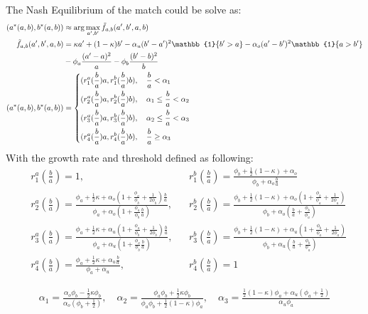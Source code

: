\documentclass{article}
\newcommand{\1}{\mathbb{1}}
\begin{document}
The Nash Equilibrium of the match could be solve as: 
\begin{align*}
(a^*(a,b),b^*(a,b))&\approx \arg\max_{a',b'} \tilde{f}_{a,b}(a',b',a,b) \\
\tilde{f}_{a,b}(a',b',a,b)&=\kappa a'+(1-\kappa) b'-\alpha_u(b'-a')^2\1\{b'>a\}-\alpha_o(a'-b')^2\1\{a>b'\} \\
								&-\phi_a\frac{(a'-a)^2}{a}-\phi_b\frac{(b'-b)^2}{b} \\
(a^*(a,b),b^*(a,b)) 
&= \begin{dcases}
(r_1^a(\frac{b}{a})a,r_1^b(\frac{b}{a})b), \quad  \frac{b}{a}< \alpha_1\\
(r_2^a(\frac{b}{a})a,r_2^b(\frac{b}{a})b), \quad \alpha_1 \leq \frac{b}{a} < \alpha_2\\
(r_3^a(\frac{b}{a})a,r_3^b(\frac{b}{a})b), \quad \alpha_2 \leq \frac{b}{a} < \alpha_3 \\
(r_4^a(\frac{b}{a})a,r_4^b(\frac{b}{a})b), \quad  \frac{b}{a} \geq \alpha_3
\end{dcases} 
\end{align*}
With the growth rate and threshold defined as following: 
\begin{align*}
&r_1^a(\frac{b}{a}) = 1 , && r_1^b(\frac{b}{a}) = \frac{\phi_b+\frac{1}{2}(1-\kappa)+\alpha_o}{\phi_b+\alpha_o\frac{b}{a}} \\
&r_2^a(\frac{b}{a}) = \frac{\phi_a+\frac{1}{2}\kappa+\alpha_o(1+\frac{\phi_a}{\phi_b}+\frac{1}{2\phi_b})\frac{b}{a}}{\phi_a+\alpha_o(1+\frac{\phi_a}{\phi_b}\frac{b}{a})} , && r_2^b(\frac{b}{a}) = \frac{\phi_b+\frac{1}{2}(1-\kappa)+\alpha_o(1+\frac{\phi_b}{\phi_a}+\frac{1}{2\phi_a})}{\phi_b+\alpha_o(\frac{b}{a}+\frac{\phi_b}{\phi_a})} \\
&r_3^a(\frac{b}{a}) = \frac{\phi_a+\frac{1}{2}\kappa+\alpha_u(1+\frac{\phi_a}{\phi_b}+\frac{1}{2\phi_b})\frac{b}{a}}{\phi_a+\alpha_u(1+\frac{\phi_a}{\phi_b}\frac{b}{a})} , && r_3^b(\frac{b}{a}) = \frac{\phi_b+\frac{1}{2}(1-\kappa)+\alpha_u(1+\frac{\phi_b}{\phi_a}+\frac{1}{2\phi_a})}{\phi_b+\alpha_u(\frac{b}{a}+\frac{\phi_b}{\phi_a})} \\
&r_4^a(\frac{b}{a}) = \frac{\phi_a+\frac{1}{2}\kappa+\alpha_u\frac{b}{a}}{\phi_a+\alpha_u}, && r_4^b(\frac{b}{a}) =  1 
\end{align*}

\begin{align*}
\alpha_1 =  \frac{\alpha_o\phi_b-\frac{1}{2}\kappa\phi_b}{\alpha_o(\phi_b+\frac{1}{2})}, \quad \alpha_2 = \frac{\phi_a\phi_b+\frac{1}{2}\kappa\phi_b}{\phi_a\phi_b+\frac{1}{2}(1-\kappa)\phi_a}, \quad \alpha_3 =  \frac{\frac{1}{2}(1-\kappa)\phi_a+\alpha_u(\phi_a+\frac{1}{2})}{\alpha_u\phi_a} \\
\end{align*}
\end{document}
